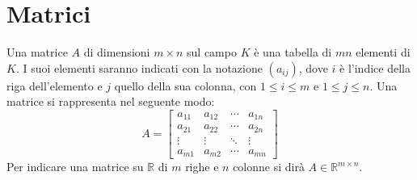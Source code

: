 \section{Matrici}
\begin{definition}
	[Matrice]
	Una matrice $A$ di dimensioni $m\times n$ sul campo $K$ è una tabella di $mn$ elementi di $K$.
  I suoi elementi saranno indicati con la notazione $( a_{ij})$, dove $i$ è l'indice della riga dell'elemento e $j$ quello della sua colonna, con $1\leqslant i\leqslant m$ e $1\leqslant j\leqslant n$.
  Una matrice si rappresenta nel seguente modo:
	\begin{equation*}
		A=\begin{bmatrix}
		a_{11} & a_{12} & \cdots  & a_{1n}\\
		a_{21} & a_{22} & \cdots  & a_{2n}\\
		\vdots  & \vdots  & \ddots  & \vdots \\
		a_{m1} & a_{m2} & \cdots  & a_{mn}
		\end{bmatrix}
	\end{equation*}
	Per indicare una matrice su $\mathbb{R}$ di $m$ righe e $n$ colonne si dirà $A\in \mathbb{R}^{m\times n}$.
\end{definition}


